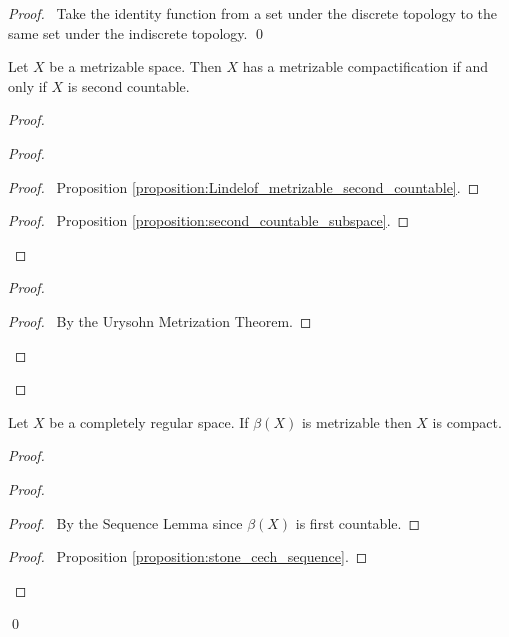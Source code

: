 \begin{proof}
    \pf\ Take the identity function from a set under the discrete topology
    to the same set under the indiscrete topology. \qed
\end{proof}

\begin{proposition}
    Let $X$ be a metrizable space. Then $X$ has a metrizable compactification if and only if $X$ is second countable.
\end{proposition}

\begin{proof}
    \pf
    \begin{proof}
        \begin{proof}
            \pf\ Proposition \ref{proposition:Lindelof_metrizable_second_countable}.
        \end{proof}
        \begin{proof}
            \pf\ Proposition \ref{proposition:second_countable_subspace}.
        \end{proof}
    \end{proof}
    \begin{proof}
        \begin{proof}
            \pf\ By the Urysohn Metrization Theorem.
        \end{proof}
    \end{proof}
\end{proof}

\begin{proposition}
    Let $X$ be a completely regular space. If $\beta(X)$ is metrizable then $X$ is compact.
\end{proposition}

\begin{proof}
    \pf
    \begin{proof}
        \begin{proof}
            \pf\ By the Sequence Lemma since $\beta(X)$ is first countable.
        \end{proof}
        \begin{proof}
            \pf\ Proposition \ref{proposition:stone_cech_sequence}.
        \end{proof}
    \end{proof}
    \qed
\end{proof}

